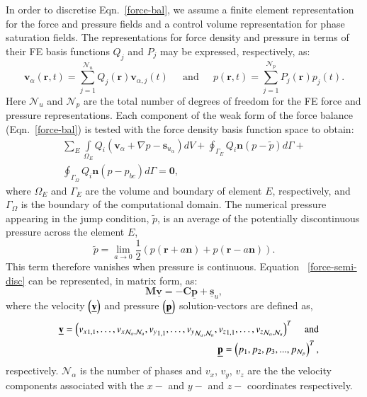 \documentclass[preprint,authoryear,12pt]{elsarticle}
\begin{document}
In order to discretise Eqn.~\ref{force-bal}, we assume a finite element representation for the force and pressure fields and a control volume representation for phase saturation fields. The representations for force density and pressure in terms of their FE basis functions $Q_{j}$ and $P_{j}$  may be expressed, respectively, as:
\begin{displaymath}
  \bm{v}_\alpha(\bm{r},t) = \sum\limits_{j=1}^{\mathcal{N}_u} Q_{j}(\bm{r})\bm{v}_{\alpha,j}(t) \;\;\;\;\text{ and } \;\;\;\; p(\bm{r},t)  = \sum\limits_{j=1}^{\mathcal{N}_p} P_{j}(\bm{r})p_{j}(t).
\end{displaymath} 
Here $\mathcal{N}_{u}$ and $\mathcal{N}_{p}$ are the total number of degrees of freedom for the FE force and pressure representations. Each component of the weak form of the force balance (Eqn.~\ref{force-bal}) is tested with the force density basis function space to obtain:
\begin{eqnarray}
  \sum\limits_{E} \left. \int\limits_{\Omega_E} { {Q}}_i
   \left ( {\mathbf v}_\alpha + \nabla p
  -{\mathbf s}_{u_\alpha} \right) dV \right. + \displaystyle
  \oint_{\Gamma_{E}} {Q}_i {\mathbf n} \left(p - \tilde{p}\right) d\Gamma
  + \nonumber \\ 
  \oint_{\Gamma_{\Omega}} { Q}_i {\mathbf n} \left(p -
  p_{bc}\right) d\Gamma = \bm{0},
  \label{force-semi-disc} 
\end{eqnarray} 
where $\Omega_E$ and $\Gamma_{E}$ are the volume and boundary of element $E$, respectively, and $\Gamma_{\Omega}$ is the boundary of the computational domain. The numerical pressure appearing in the jump condition, $\tilde{p}$, is an average of the potentially discontinuous pressure across the element $E$,
\[\tilde{p}=\lim_{a\rightarrow 0} 
   \frac{1}{2}\left(p(\bm{r}+a\bm{n})+p(\bm{r}-a\bm{n})\right).\] This term therefore vanishes when pressure is continuous. Equation ~\ref{force-semi-disc} can be represented, in matrix form, as:
\begin{equation}
  {\mathbf M} \underline {\mathbf v} = -{\mathbf C} \underline {\mathbf p} + \underline {\mathbf s}_{u}, \label{force-balance-matrix-form}
\end{equation}
where the velocity $\left(\underline{\bf v}\right)$ and pressure $\left(\underline{\bf p}\right)$ solution-vectors are defined as,
\begin{eqnarray}
  &&\underline{{\bf v}} = \left({v_x}_{1,1},\ldots,{v_x}_{\mathcal{N}_\alpha,
    \mathcal{N}_u}, {v_y}_{1,1},\ldots,{v_y}_{\mathcal{N}_\alpha,
    \mathcal{N}_u},{v_z}_{1,1},\ldots,{v_z}_{\mathcal{N}_\alpha,
    \mathcal{N}_u}\right)^{T} \;\;\;\;\text{and} \nonumber \\ &&
  \underline{{\bf p}} = \left(p_1, p_2, p_3, ...,
  p_{\mathcal{N}_p}\right)^T, \nonumber \nonumber
\end{eqnarray}
respectively. $\mathcal{N}_{\alpha}$ is the number of phases and 
$v_x$, $v_y$, $v_z$ are the the velocity components 
associated with the $x-$ and $y-$ and $z-$ coordinates respectively. 
\end{document}
